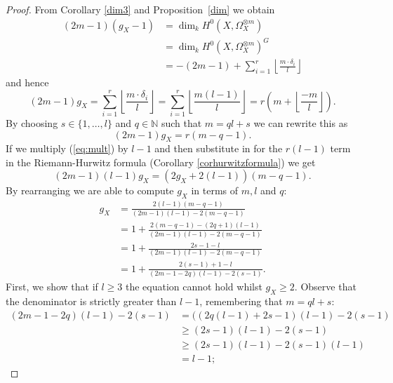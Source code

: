 \begin{proof}
    
    From Corollary \ref{dim3} and Proposition~\ref{dim} we obtain
        \begin{align*}
        (2m-1)(g_X-1)& =\dim_kH^0(X,\Omega_X^{\otimes m}) \\
        & =  \dim_kH^0(X,\Omega_X^{\otimes m})^G\\
        & =-(2m-1)+\sum_{i=1}^r \left\lfloor \frac{m\cdot \delta_i}{l} \right\rfloor
        \end{align*}
    and hence
        \begin{equation*}
        (2m-1)g_X = \sum_{i=1}^r \left\lfloor \frac{m\cdot \delta_i}{l} \right\rfloor
        = \sum_{i=1}^r \left\lfloor \frac{m(l-1)}{l} \right\rfloor
        = r\left( m+\left\lfloor \frac{-m}{l} \right\rfloor \right).
        \end{equation*}
    By choosing $s\in \{1,\ldots ,l\}$ and $q\in \mathbb{N}$ such that $m=ql+s$ we can rewrite this as
        \begin{equation}\label{eq:mult}
        (2m-1)g_X=r(m-q-1).
        \end{equation}
    If we multiply (\ref{eq:mult}) by $l-1$ and then substitute in for the $r(l-1)$ term in the Riemann-Hurwitz formula (Corollary \ref{corhurwitzformula}) we get
        \begin{equation*}
        (2m-1)(l-1)g_X=(2g_X+2(l-1))(m-q-1).
        \end{equation*}
    By rearranging we are able to compute $g_X$ in terms of $m,l$ and $q$:
        \begin{align}\label{equationgxintermsofmandlandq}
        g_X & = \frac{2(l-1)(m-q-1)}{(2m-1)(l-1)-2(m-q-1)} \nonumber \\
        & =  1 + \frac{2(m-q-1)-(2q+1)(l-1)}{(2m-1)(l-1)-2(m-q-1)}  \nonumber\\
        & =  1 + \frac{2s-1-l}{(2m-1)(l-1)-2(m-q-1)} \nonumber  \\
        & =  1 + \frac{2(s-1)+1-l}{(2m-1-2q)(l-1)-2(s-1)}. 
        \end{align}
    First, we show that if $l\geq 3$ the equation cannot hold whilst $g_X\geq 2$.
    Observe that the denominator is strictly greater than $l-1$, remembering that $m=ql+s$:
        \begin{align*}
        (2m-1-2q)(l-1)-2(s-1) & =  ((2q(l-1)+2s-1)(l-1)-2(s-1) \\
        & \geq  (2s-1)(l-1)-2(s-1) \\
        & \geq  (2s-1)(l-1)-2(s-1)(l-1) \\
        & =  l-1;

\end{align*}
\end{proof}
